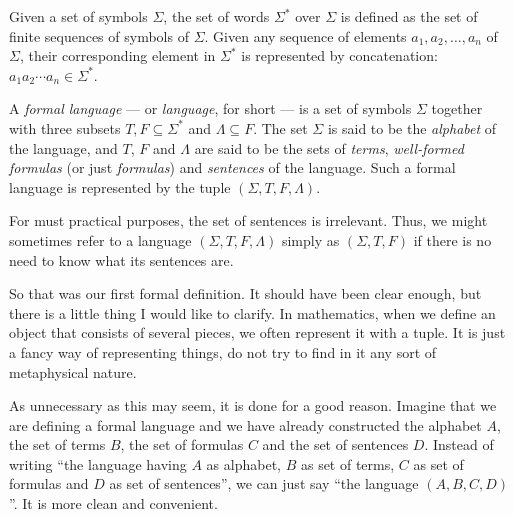 \begin{definition}
Given a set of symbols $\Sigma$, the set of words $\Sigma^*$ over $\Sigma$ is defined as the set of finite sequences of symbols of $\Sigma$.
Given any sequence of elements $a_1,a_2,\ldots,a_n$ of $\Sigma$, their corresponding element in $\Sigma^*$ is represented by concatenation: $a_1a_2\cdots a_n\in \Sigma^*$.

A \emph{formal language} --- or \emph{language}, for short --- is a set of symbols $\Sigma$ together with three subsets $T,F\subseteq \Sigma^*$ and $\Lambda \subseteq F$.
The set $\Sigma$ is said to be the \emph{alphabet} of the language, and $T$, $F$ and $\Lambda$ are said to be the sets of \emph{terms}, \emph{well-formed formulas} (or just \emph{formulas}) and \emph{sentences} of the language.
Such a formal language is represented by the tuple $(\Sigma, T, F, \Lambda)$.


For must practical purposes, the set of sentences is irrelevant.
Thus, we might sometimes refer to a language $(\Sigma, T, F, \Lambda)$ simply as $(\Sigma, T, F)$ if there is no need to know what its sentences are. 
\end{definition}

\begin{para}
So that was our first formal definition.
It should have been clear enough, but there is a little thing I would like to clarify.
In mathematics, when we define an object that consists of several pieces, we often represent it with a tuple.
It is just a fancy way of representing things, do not try to find in it any sort of metaphysical nature.

As unnecessary as this may seem, it is done for a good reason.
Imagine that we are defining a formal language and we have already constructed the alphabet $A$, the set of terms $B$, the set of formulas $C$ and the set of sentences $D$.
Instead of writing ``the language having $A$ as alphabet, $B$ as set of terms, $C$ as set of formulas and $D$ as set of sentences'', we can just say ``the language $(A,B,C,D)$''.
It is more clean and convenient.
\end{para}

